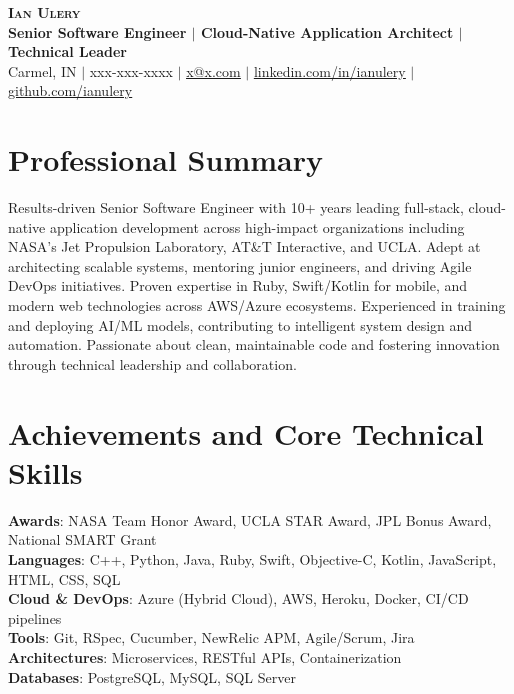 \documentclass[letterpaper,11pt]{article}
\begin{document}
  \begin{center}
    \textbf{\Huge \scshape Ian Ulery} \\
    \vspace{3pt}
    \textbf{
      \small{
        Senior Software Engineer $|$ Cloud-Native Application Architect $|$ Technical Leader
      }
    } \\
    \vspace{3pt}
    \small
      Carmel, IN $|$
      xxx-xxx-xxxx $|$
      \href{mailto:x@x.com}{\underline{x@x.com}} $|$
      \href{https://linkedin.com/in/ianulery}{\underline{linkedin.com/in/ianulery}} $|$
      \href{https://github.com/ianulery}{\underline{github.com/ianulery}}
  \end{center}

  \section{Professional Summary}
    \small{
      Results-driven Senior Software Engineer with 10+ years leading full-stack, cloud-native application development across high-impact organizations including NASA's Jet Propulsion Laboratory, AT\&T Interactive, and UCLA. Adept at architecting scalable systems, mentoring junior engineers, and driving Agile DevOps initiatives. Proven expertise in Ruby, Swift/Kotlin for mobile, and modern web technologies across AWS/Azure ecosystems. Experienced in training and deploying AI/ML models, contributing to intelligent system design and automation. Passionate about clean, maintainable code and fostering innovation through technical leadership and collaboration.
    }

  \section{Achievements and Core Technical Skills}
    \begin{itemize}[leftmargin=0.15in, label={}]
      \small{\item{
        \textbf{Awards}{: NASA Team Honor Award, UCLA STAR Award, JPL Bonus Award, National SMART Grant} \\
        \textbf{Languages}{: C++, Python, Java, Ruby, Swift, Objective-C, Kotlin, JavaScript, HTML, CSS, SQL} \\
        \textbf{Cloud \& DevOps}{: Azure (Hybrid Cloud), AWS, Heroku, Docker, CI/CD pipelines} \\
        \textbf{Tools}{: Git, RSpec, Cucumber, NewRelic APM, Agile/Scrum, Jira} \\
        \textbf{Architectures}{: Microservices, RESTful APIs, Containerization} \\
        \textbf{Databases}{: PostgreSQL, MySQL, SQL Server}
      }}
    \end{itemize}
\end{document}
